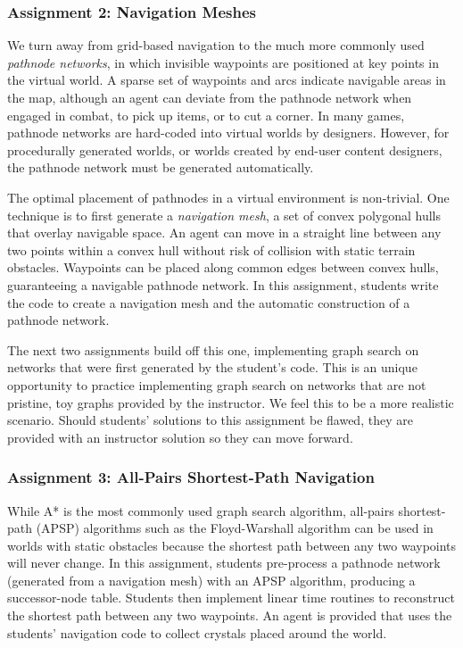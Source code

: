 \documentclass[letterpaper]{article}
\begin{document}
\subsubsection{Assignment 2: Navigation Meshes}
We turn away from grid-based navigation to the much more commonly used {\em pathnode networks}, in which invisible waypoints are positioned at key points in the virtual world.
A sparse set of waypoints and arcs indicate navigable areas in the map, although an agent can deviate from the pathnode network when engaged in combat, to pick up items, or to cut a corner.
In many games, pathnode networks are hard-coded into virtual worlds by designers.
However, for procedurally generated worlds, or worlds created by end-user content designers, the pathnode network must be generated automatically.

The optimal placement of pathnodes in a virtual environment is non-trivial.
One technique is to first generate a {\em navigation mesh}, a set of convex polygonal hulls that overlay navigable space.
An agent can move in a straight line between any two points within a convex hull without risk of collision with static terrain obstacles.
Waypoints can be placed along common edges between convex hulls, guaranteeing a navigable pathnode network.
In this assignment, students write the code to create a navigation mesh and the automatic construction of a pathnode network.

The next two assignments build off this one, implementing graph search on networks that were first generated by the student's code. 
This is an unique opportunity to practice implementing graph search on networks that are not pristine, toy graphs provided by the instructor. We feel this to be a more realistic scenario.
Should students' solutions to this assignment be flawed, they are provided with an instructor solution so they can move forward. 

\subsubsection{Assignment 3: All-Pairs Shortest-Path Navigation}
While A* is the most commonly used graph search algorithm, all-pairs shortest-path (APSP) algorithms such as the Floyd-Warshall algorithm can be used in worlds with static obstacles because the shortest path between any two waypoints will never change.
In this assignment, students pre-process a pathnode network (generated from a navigation mesh) with an APSP algorithm, producing a successor-node table.
Students then implement linear time routines to reconstruct the shortest path between any two waypoints.
An agent is provided that uses the students' navigation code to collect crystals placed around the world.
\end{document}
